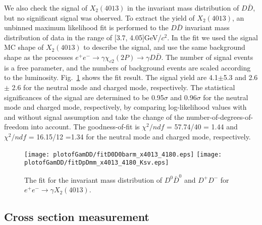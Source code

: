 \documentclass[aps,preprint,tightenlines,superscriptaddress,showpacs,byrevtex,amsmath,amssymb,nofloatfix]{revtex4}
\begin{document}
We also check the signal of $X_{2}(4013)$ in the invariant mass distribution of  $D\bar{D}$, but no significant signal was observed. To extract the yield of $X_{2}(4013)$, an unbinned maximum likelihood fit is performed to the $D\bar{D}$  invariant mass distribution of data in the range of [3.7, 4.05]GeV/$c^{2}$. In the fit we used the signal MC shape of $X_{2}(4013)$ to describe the signal, and use the same background shape as the processes $e^{+}e^{-}\rightarrow \gamma \chi_{c2} (2P)\rightarrow \gamma D\bar{D}$.  The number of signal events is a free parameter, and the numbers of background events are scaled according to the luminosity. Fig.~\ref{fitmDDbar_4013} shows the fit result. The signal yield are 4.1$\pm$5.3 and 2.6 $\pm$ 2.6 for the neutral mode and charged mode, respectively.  The statistical significances of the signal are determined to be 0.95$\sigma$  and  0.96$\sigma$ for the neutral mode and charged mode, respectively, by comparing log-likelihood values with and without signal assumption and take the change of the number-of-degrees-of-freedom into account. The goodness-of-fit is $\chi^{2}/ndf$ = 57.74/40 = 1.44 and $\chi^{2}/ndf$ = 16.15/12 =1.34 for the neutral mode and charged mode, respectively.

\begin{figure}[!htbp]
  \captionsetup{justification=raggedright}
    \texttt{[image: plotofGamDD/fitD0D0barm\_x4013\_4180.eps]}
    \texttt{[image: plotofGamDD/fitDpDmm\_x4013\_4180\_Ksv.eps]}

  \caption{\small The fit for the invariant mass distribution of $D^{0}\bar{D}^{0}$ and $D^{+}D^{-}$ for $e^{+}e^{-} \rightarrow \gamma X_{2}(4013)$.}
  \label{fitmDDbar_4013}
\end{figure}

 \subsection{Cross section  measurement}
\end{document}
